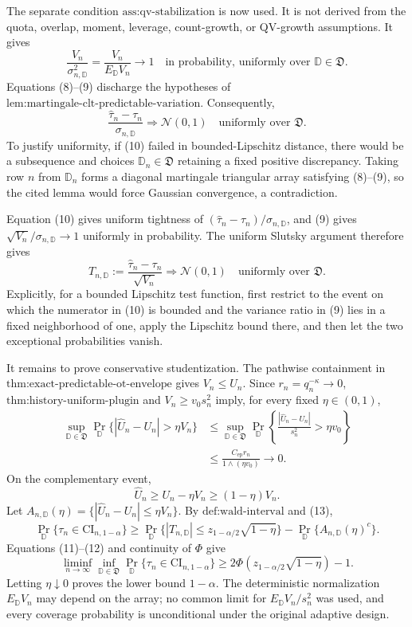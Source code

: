 The separate condition \(\text{ass:qv-stabilization}\) is now used. It is not derived from the quota, overlap, moment, leverage, count-growth, or QV-growth assumptions. It gives
\[
\frac{V_n}{\sigma_{n,\mathbb D}^2}
=\frac{V_n}{E_{\mathbb D}V_n}\longrightarrow1
\quad\text{in probability, uniformly over }\mathbb D\in\mathfrak D.
\tag{9}
\]
Equations (8)--(9) discharge the hypotheses of \(\text{lem:martingale-clt-predictable-variation}\). Consequently,
\[
\frac{\widehat\tau_n-\tau_n}{\sigma_{n,\mathbb D}}
\Rightarrow\mathcal N(0,1)
\quad\text{uniformly over }\mathfrak D.
\tag{10}
\]
To justify uniformity, if (10) failed in bounded-Lipschitz distance, there would be a subsequence and choices \(\mathbb D_n\in\mathfrak D\) retaining a fixed positive discrepancy. Taking row \(n\) from \(\mathbb D_n\) forms a diagonal martingale triangular array satisfying (8)--(9), so the cited lemma would force Gaussian convergence, a contradiction.

Equation (10) gives uniform tightness of \((\widehat\tau_n-\tau_n)/\sigma_{n,\mathbb D}\), and (9) gives \(\sqrt{V_n}/\sigma_{n,\mathbb D}\to1\) uniformly in probability. The uniform Slutsky argument therefore gives
\[
T_{n,\mathbb D}:=\frac{\widehat\tau_n-\tau_n}{\sqrt{V_n}}
\Rightarrow\mathcal N(0,1)
\quad\text{uniformly over }\mathfrak D.
\tag{11}
\]
Explicitly, for a bounded Lipschitz test function, first restrict to the event on which the numerator in (10) is bounded and the variance ratio in (9) lies in a fixed neighborhood of one, apply the Lipschitz bound there, and then let the two exceptional probabilities vanish.

It remains to prove conservative studentization. The pathwise containment in \(\text{thm:exact-predictable-ot-envelope}\) gives \(V_n\le U_n\). Since \(r_n=q_n^{-\kappa}\to0\), \(\text{thm:history-uniform-plugin}\) and \(V_n\ge v_0s_n^2\) imply, for every fixed \(\eta\in(0,1)\),
\[
\begin{aligned}
\sup_{\mathbb D\in\mathfrak D}
\Pr_{\mathbb D}\{ |\widehat U_n-U_n|>\eta V_n\}
&\le\sup_{\mathbb D\in\mathfrak D}
\Pr_{\mathbb D}\left\{\frac{|\widehat U_n-U_n|}{s_n^2}>\eta v_0\right\}\\
&\le\frac{C_{\mathrm{ep}}r_n}{1\wedge(\eta v_0)}\longrightarrow0.
\end{aligned}
\tag{12}
\]
On the complementary event,
\[
\widehat U_n\ge U_n-\eta V_n\ge(1-\eta)V_n.
\tag{13}
\]
Let \(A_{n,\mathbb D}(\eta)=\{|\widehat U_n-U_n|\le\eta V_n\}\). By \(\text{def:wald-interval}\) and (13),
\[
\Pr_{\mathbb D}\{\tau_n\in\mathrm{CI}_{n,1-\alpha}\}
\ge\Pr_{\mathbb D}\{|T_{n,\mathbb D}|\le z_{1-\alpha/2}\sqrt{1-\eta}\}
-\Pr_{\mathbb D}\{A_{n,\mathbb D}(\eta)^c\}.
\]
Equations (11)--(12) and continuity of \(\Phi\) give
\[
\liminf_{n\to\infty}\inf_{\mathbb D\in\mathfrak D}
\Pr_{\mathbb D}\{\tau_n\in\mathrm{CI}_{n,1-\alpha}\}
\ge2\Phi\!\left(z_{1-\alpha/2}\sqrt{1-\eta}\right)-1.
\tag{14}
\]
Letting \(\eta\downarrow0\) proves the lower bound \(1-\alpha\). The deterministic normalization \(E_{\mathbb D}V_n\) may depend on the array; no common limit for \(E_{\mathbb D}V_n/s_n^2\) was used, and every coverage probability is unconditional under the original adaptive design.